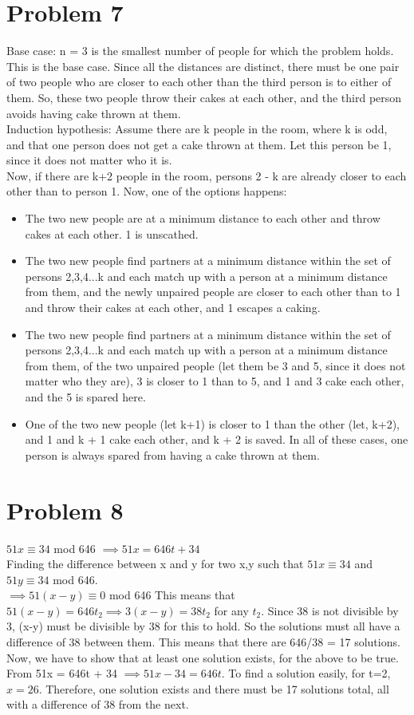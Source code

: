 \documentclass[english]{article}
\begin{document}
\section*{Problem 7}
Base case:  n = 3 is the smallest number of people for which the problem holds.
This is the base case.  Since all the distances are distinct, there must be one pair of two people who are closer to each other than the third person is to either of them. So, these two people throw their cakes at each other, and the third person avoids having cake thrown at them. \\
Induction hypothesis: Assume there are k people in the room, where k is odd, and that one person does not get a cake thrown at them. Let this person be 1, since it does not matter who it is.\\
Now, if there are k+2 people in the room, persons 2 - k are already closer to each other than to person 1. Now, one of the options happens:\\
\begin{itemize}
\item The two new people are at a minimum distance to each other and throw cakes at each other. 1 is unscathed.
\item The two new people find partners at a minimum distance within the set of persons {2,3,4...k} and each match up with a person at a minimum distance from them, and the newly unpaired people are closer to each other than to 1 and throw their cakes at each other, and 1 escapes a caking.
\item The two new people find partners at a minimum distance within the set of persons {2,3,4...k} and each match up with a person at a minimum distance from them, of the two unpaired people (let them be 3 and 5, since it does not matter who they are), 3 is closer to 1 than to 5, and 1 and 3 cake each other, and the 5 is spared here. 
\item One of the two new people (let k+1) is closer to 1 than the other (let, k+2), and 1 and k + 1 cake each other, and k + 2 is saved. 
In all of these cases, one person is always spared from having a cake thrown at them. 
\end{itemize}
\section*{Problem 8}
$ 51x \equiv 34$ mod 646 $\implies 51x = 646t + 34$\\
Finding the difference between x and y for two x,y such that $51x \equiv 34 $ and $51y \equiv 34$ mod 646. \\
$\implies 51(x-y) \equiv 0$ mod 646
This means that $51(x-y) = 646t_2 \implies 3(x-y) = 38t_2$ for any $t_2$. Since 38 is not divisible by 3, (x-y) must be divisible by 38 for this to hold. So the solutions must all have a difference of 38 between them. This means that there are 646/38 = 17 solutions. \\
Now, we have to show that at least one solution exists, for the above to be true.  From 51x = 646t + 34 $\implies 51x - 34 = 646t$. To find a solution easily, for t=2, $x = 26$. Therefore, one solution exists and there must be 17 solutions total, all with a difference of 38 from the next. 
\end{document}
